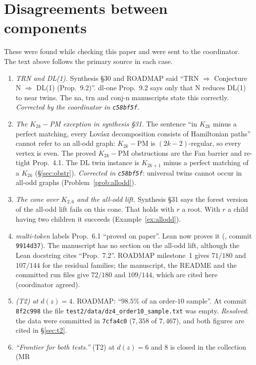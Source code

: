 \documentclass[11pt]{amsart}
\theoremstyle{definition}
\begin{document}
\section{Disagreements between components}\label{sec:disc}

These were found while checking this paper and were sent to the coordinator. The text above follows the
primary source in each case.
\begin{enumerate}[leftmargin=*]
\item \emph{TRN and DL(1).} Synthesis \S30 and ROADMAP said ``TRN $\Rightarrow$ Conjecture N
$\Rightarrow$ DL(1) (Prop.~9.2)''. dl-one Prop.~9.2 says only that N reduces DL(1) to near twins. The na,
trn and conj-n manuscripts state this correctly. \emph{Corrected by the coordinator in
\texttt{c58bf5f}.}
\item \emph{The $K_{2k}-$PM exception in synthesis \S31.} The sentence ``in $K_{2k}$ minus a perfect
matching, every Lov\'asz decomposition consists of Hamiltonian paths'' cannot refer to an all-odd
graph: $K_{2k}-$PM is $(2k-2)$-regular, so every vertex is even. The proved $K_{2k}-$PM obstructions are
the Fan barrier and re-tight Prop.~4.1. The DL twin instance is $K_{2k+1}$ minus a perfect matching of
a $K_{2k}$ (\S\ref{sec:obstr}). \emph{Corrected in \texttt{c58bf5f}}: universal twins cannot occur in
all-odd graphs (Problem~\ref{prob:allodd}).
\item \emph{The cone over $K_{2,6}$ and the all-odd lift.} Synthesis \S31 says the forest version of the
all-odd lift fails on this cone. That holds with $r$ a root. With $r$ a child having two children it
succeeds (Example~\ref{ex:allodd}).
\item \emph{multi-token} labels Prop.~6.1 ``proved on paper''. Lean now proves it
(, commit \texttt{9914d37}). The manuscript has no section on the all-odd
lift, although the Lean docstring cites ``Prop.~7.2''. ROADMAP milestone~1 gives $71/180$ and
$107/144$ for the residual families; the manuscript, the README and the committed run files give
$72/180$ and $109/144$, which are cited here (coordinator agreed).
\item \emph{(T2) at $d(z)=4$.} ROADMAP: ``$98.5\%$ of an order-$10$ sample''. At commit
\texttt{8f2c998} the file \texttt{test2/data/dz4\_order10\_sample.txt} was empty. \emph{Resolved}: the
data were committed in \texttt{7cfa4c0} ($7{,}358$ of $7{,}467$), and both figures are cited in
\S\ref{sec:t2}.
\item \emph{``Frontier for both tests.''} (T2) at $d(z)=6$ and $8$ is closed in the collection (MR

\end{enumerate}
\end{document}
